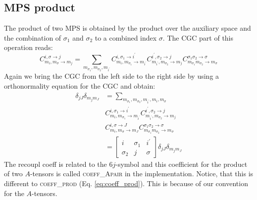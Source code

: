 \documentclass[a4paper,10pt,parskip=full]{scrartcl}
\begin{document}
\subsection{MPS product}
The product of two MPS is obtained by the product over the auxiliary space and the combination
of $\sigma_1$ and $\sigma_2$ to a combined index $\sigma$.
The CGC part of this operation reads:
\begin{equation}
  C^{i,\sigma\rightarrow j}_{m_i,m_{\sigma}\rightarrow m_{j}}=
  \sum_{m_{\sigma_1},m_{\sigma_2},m_{i^\prime}}
  C^{i,\sigma_1\rightarrow i^\prime}_{m_i,m_{\sigma_1}\rightarrow m_{i^\prime}}
  C^{i^\prime,\sigma_2\rightarrow j}_{m_{i^\prime},m_{\sigma_2}\rightarrow m_{j}}
  C^{\sigma_1\sigma_2\rightarrow\sigma}_{m_{\sigma_1}m_{\sigma_2}\rightarrow m_{\sigma}}
\end{equation}
Again we bring the CGC from the left side to the right side by using a orthonormality equation for the CGC
and obtain:
\begin{equation}
  \begin{split}
    \delta_{jJ}\delta_{m_jm_J}&=
    \sum_{m_{\sigma_1},m_{\sigma_2},m_{i^\prime},m_i,m_{\sigma}}\\
    &C^{i,\sigma_1\rightarrow i^\prime}_{m_i,m_{\sigma_1}\rightarrow m_{i^\prime}}
    C^{i^\prime,\sigma_2\rightarrow j}_{m_{i^\prime},m_{\sigma_2}\rightarrow m_{j}}\\
    &C^{i,\sigma\rightarrow J}_{m_i,m_{\sigma}\rightarrow m_{J}}
    C^{\sigma_1\sigma_2\rightarrow\sigma}_{m_{\sigma_1}m_{\sigma_2}\rightarrow m_{\sigma}}\\
    &=
    \begin{bmatrix}
      i & \sigma_1 & i^\prime \\
      \sigma_2 & j & \sigma
    \end{bmatrix}\delta_{jJ}\delta_{m_jm_J}
  \end{split}
\end{equation}
The recoupl coeff is related to the $6j$-symbol and this coefficient
for the product of two $A$-tensors is called \textsc{coeff\_Apair}
in the implementation. Notice, that this is different to \textsc{coeff\_prod} (Eq. \eqref{eq:coeff_prod}).
This is because of our convention for the $A$-tensors.
\end{document}
